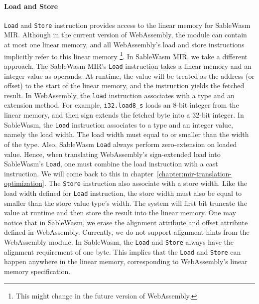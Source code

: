 \paragraph{Load and Store}
\texttt{Load} and \texttt{Store} instruction provides access to the linear
memory for SableWasm MIR. Although in the current version of WebAssembly, the
module can contain at most one linear memory, and all WebAssembly's load and
store instructions implicitly refer to this linear memory \footnote{This might
  change in the future version of WebAssembly.}. In SableWasm MIR, we take a
different approach. The SableWasm MIR's \texttt{Load} instruction takes a linear
memory and an integer value as operands. At runtime, the value will be treated
as the address (or offset) to the start of the linear memory, and the
instruction yields the fetched result. In WebAssembly, the \texttt{load}
instruction associates with a type and an extension method. For example,
\texttt{i32.load8\_s} loads an 8-bit integer from the linear memory, and then
sign extends the fetched byte into a 32-bit integer. In SableWasm, the
\texttt{Load} instruction associates to a type and an integer value, namely the
load width. The load width must equal to or smaller than the width of the type.
Also, SableWasm \texttt{Load} always perform zero-extension on loaded value.
Hence, when translating WebAssembly's sign-extended load into SableWasm's
\texttt{Load}, one must combine the load instruction with a cast instruction.
We will come back to this in chapter~\ref{chapter:mir-translation-optimization}.
The \texttt{Store} instruction
also associate with a store width. Like the load width defined for \texttt{Load}
instruction, the store width must also be equal to smaller than the store value
type's width. The system will first bit truncate the value at runtime and then
store the result into the linear memory. One may notice that in SableWasm, we
erase the alignment attribute and offset attribute defined in WebAssembly.
Currently, we do not support alignment hints from the WebAssembly module. In
SableWasm, the \texttt{Load} and \texttt{Store} always have the alignment
requirement of one byte. This implies that the \texttt{Load} and \texttt{Store}
can happen anywhere in the linear memory, corresponding to WebAssembly's linear
memory specification.

